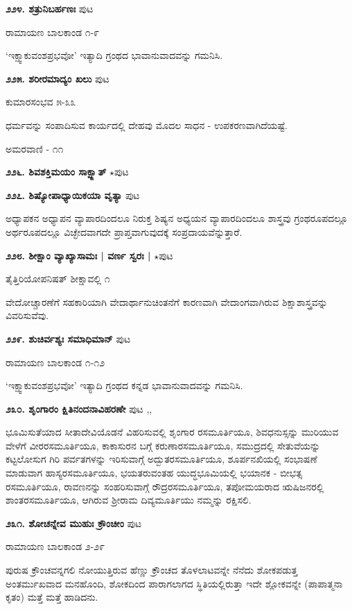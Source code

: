 {\medskip
\noindent\textbf{೨೨೪. ಶತ್ರುನಿಬರ್ಹಣಃ} \hfill ಪುಟ \pageref{250}

\hfill ರಾಮಾಯಣ ಬಾಲಕಾಂಡ ೧-೯

`ಇಕ್ಷ್ವಾಕುವಂಶಪ್ರಭವೋ' ಇತ್ಯಾದಿ ಗ್ರಂಥದ ಭಾವಾನುವಾದವನ್ನು ಗಮನಿಸಿ.

\medskip
\noindent\textbf{೨೨೫. ಶರೀರಮಾದ್ಯಂ ಖಲು} \hfill ಪುಟ \pageref{76}

\hfill ಕುಮಾರಸಂಭವ ೫-೩೩

ಧರ್ಮವನ್ನು ಸಂಪಾದಿಸುವ ಕಾರ್ಯದಲ್ಲಿ ದೇಹವು ಮೊದಲ ಸಾಧನ - ಉಪಕರಣವಾಗಿದೆಯಷ್ಟೆ. 

\hfill ಅಮರವಾಣಿ - ೧೧

\medskip
\noindent\textbf{೨೨೬. ಶಿವಶಕ್ತಿಮಯಂ ಸಾಕ್ಷ್ಜಾತ್} $\star$\hfill ಪುಟ \pageref{32}

\medskip
\noindent\textbf{೨೨೭. ಶಿಷ್ಯೋಪಾಧ್ಯಾಯಿಕಯಾ ವೃತ್ಯಾ} \hfill ಪುಟ \pageref{45}

ಅಧ್ಯಾಪಕನ ಅಧ್ಯಾಪನ ವ್ಯಾಪಾರದಿಂದಲೂ ನಿರುಕ್ತ ಶಿಷ್ಯನ ಅಧ್ಯಯನ ವ್ಯಾಪಾರದಿಂದಲೂ ಶಾಸ್ತ್ರವು ಗ್ರಂಥರೂಪದಲ್ಲೂ ಅರ್ಥರೂಪದಲ್ಲೂ ವಿಚ್ಛೇದವಾಗದೇ ಪ್ರಾಪ್ತವಾಗುವುದಕ್ಕೆ ಸಂಪ್ರದಾಯವೆನ್ನುತ್ತಾರೆ.

\medskip
\noindent\textbf{೨೨೮. ಶೀಕ್ಷಾಂ ವ್ಯಾಖ್ಯಾಸಾಮಃ | ವರ್ಣ ಸ್ವರಃ |} $\star$\hfill ಪುಟ \pageref{10}

\hfill ತೈತ್ತಿರಿಯೋಪನಿಷತ್ ಶೀಕ್ಷಾವಲ್ಲಿ ೧

ವೇದೋಚ್ಚಾರಣೆಗೆ ಸಹಕಾರಿಯಾಗಿ ವೇದಾರ್ಥಾನುಚಿಂತನೆಗೆ ಕಾರಣವಾಗಿ ವೇದಾಂಗವಾಗಿರುವ ಶಿಕ್ಷಾಶಾಸ್ತ್ರವನ್ನು ವಿವರಿಸುವೆವು.

\medskip
\noindent\textbf{೨೨೯. ಶುಚಿರ್ವಶ್ಯಃ ಸಮಾಧಿಮಾನ್} \hfill ಪುಟ \pageref{255}

\hfill ರಾಮಾಯಣ ಬಾಲಕಾಂಡ ೧-೧೨

`ಇಕ್ಷ್ವಾಕುವಂಶಪ್ರಭವೋ' ಇತ್ಯಾದಿ ಗ್ರಂಥದ ಕನ್ನಡ ಭಾವಾನುವಾದವನ್ನು ಗಮನಿಸಿ.

\medskip
\noindent\textbf{೨೩೦. ಶೃಂಗಾರಂ ಕ್ಷಿತಿನಂದನಾವಿಹರಣೇ} \hfill ಪುಟ \pageref{182},\pageref{208},\pageref{219}

ಭೂಮಿಸುತೆಯಾದ ಸೀತಾದೇವಿಯೊಡನೆ ವಿಹರಿಸುವಲ್ಲಿ ಶೃಂಗಾರ ರಸಮೂರ್ತಿಯೂ, ಶಿವಧನುಸ್ಸನ್ನು ಮುರಿಯುವ ವೇಳೆಗೆ ವೀರರಸಮೂರ್ತಿಯೂ, ಕಾಕಾಸುರನ ಬಗ್ಗೆ ಕರುಣಾರಸಮೂರ್ತಿಯೂ, ಸಮುದ್ರದಲ್ಲಿ ಸೇತುವೆಯನ್ನು ಕಟ್ಟಲೋಸುಗ ಗಿರಿ ಪರ್ವತಗಳನ್ನು ಇರಿಸುವಾಗ್ಗೆ ಅದ್ಬುತರಸಮೂರ್ತಿಯೂ, ಶೂರ್ಪನಖಿಯಲ್ಲಿ ಸಂಭಾಷಣೆ ಮಾಡುವಾಗ ಹಾಸ್ಯರಸಮೂರ್ತಿಯೂ, ಭಯತರುವಂತಹ ಯುದ್ಧಭೂಮಿಯಲ್ಲಿ ಭಯಾನಕ - ಬೀಭತ್ಸ ರಸಮೂರ್ತಿಯೂ, ರಾವಣನನ್ನು ಸಂಹರಿಸುವಾಗ್ಗೆ ರೌದ್ರರಸಮೂರ್ತಿಯೂ, ತಪೋಮಯರಾದ ಋಷಿಜನರಲ್ಲಿ ಶಾಂತರಸಮೂರ್ತಿಯೂ, ಆಗಿರುವ ಶ್ರೀರಾಮ ದಿವ್ಯಮೂರ್ತಿಯು ನಮ್ಮನ್ನು ರಕ್ಷಿಸಲಿ.

\medskip
\noindent\textbf{೨೩೧. ಶೋಚನ್ನೇವ ಮುಹುಃ ಕ್ರೌಂಚೀಂ} \hfill ಪುಟ \pageref{203}

\hfill ರಾಮಾಯಣ ಬಾಲಕಾಂಡ ೨-೨೯

ಪುರುಷ ಕ್ರೌಂಚವನ್ನಗಲಿ ನೋಯುತ್ತಿರುವ ಹೆಣ್ಣು ಕ್ರೌಂಚದ ತೊಳಲಾಟವನ್ನೇ ನೆನೆದು ಶೋಕಪಡುತ್ತ ಅಂತರ್ಮುಖವಾದ ಮನಹೊಂದಿ, ಶೋಕದಿಂದ ಪಾರಾಗಲಾಗದ ಸ್ಥಿತಿಯಲ್ಲಿರುತ್ತಾ ಇದೇ ಶ್ಲೋಕವನ್ನೇ (ಪಾಪಾತ್ಮನಾ ಕೃತಂ) ಮತ್ತೆ ಮತ್ತೆ ಹಾಡಿದನು.

}
